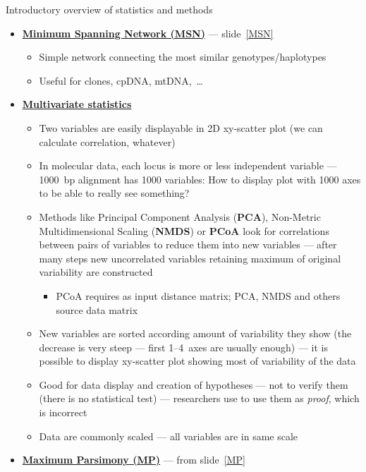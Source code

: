\documentclass[compress, xelatex, 11pt, xcolor=svgnames, aspectratio=169, url={hyphens, lowtilde}]{beamer}
\begin{document}
\begin{frame}[allowframebreaks]{Introductory overview of statistics and methods}
\begin{itemize}
\begin{itemize}
\begin{itemize}
			\end{itemize}
		\end{itemize}
		\item \textbf{\href{https://en.wikipedia.org/wiki/Minimum_spanning_tree}{Minimum Spanning Network (MSN)}} --- slide~\ref{MSN}
		\begin{itemize}
			\item Simple network connecting the most similar genotypes/haplotypes
			\item Useful for clones, cpDNA, mtDNA,~\ldots
			\end{itemize}
		\item \textbf{\href{https://en.wikipedia.org/wiki/Multivariate_statistics}{Multivariate statistics}}
		\begin{itemize}
			\item Two variables are easily displayable in 2D xy-scatter plot (we can calculate correlation, whatever)
			\item In molecular data, each locus is more or less independent variable --- 1000~bp alignment has 1000 variables: How to display plot with 1000 axes to be able to really see something?
			\item Methods like Principal Component Analysis (\textbf{PCA}), Non-Metric Multidimensional Scaling (\textbf{NMDS}) or \textbf{PCoA} look for correlations between pairs of variables to reduce them into new variables --- after many steps new uncorrelated variables retaining maximum of original variability are constructed
			\begin{itemize}
				\item PCoA requires as input distance matrix; PCA, NMDS and others source data matrix
			\end{itemize}
			\item New variables are sorted according amount of variability they show (the decrease is very steep --- first 1--4~axes are usually enough) --- it is possible to display xy-scatter plot showing most of variability of the data
			\item Good for data display and creation of hypotheses --- not to verify them (there is no statistical test) --- researchers use to use them as \textit{proof}, which is incorrect
			\item Data are commonly scaled --- all variables are in same scale
		\end{itemize}
		\item \textbf{\href{https://en.wikipedia.org/wiki/Maximum_parsimony}{Maximum Parsimony (MP)}} --- from slide~\ref{MP}

\end{itemize}
\end{frame}
\end{document}

